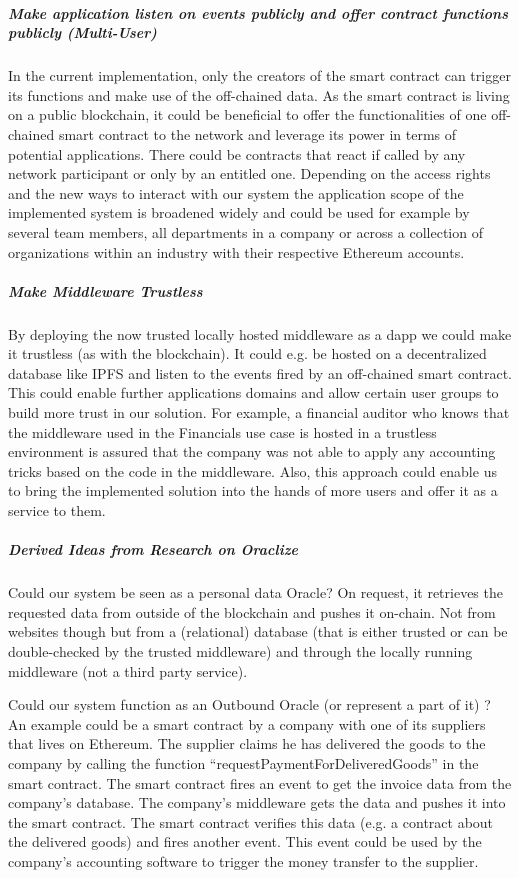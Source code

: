 \subparagraph{Make application listen on events publicly and offer contract functions publicly (Multi-User)}
In the current implementation, only the creators of the smart contract can trigger its functions and make use of the off-chained data. As the smart contract is living on a public blockchain, it could be beneficial to offer the functionalities of one off-chained smart contract to the network and leverage its power in terms of potential applications. There could be contracts that react if called by any network participant or only by an entitled one. Depending on the access rights and the new ways to interact with our system the application scope of the implemented system is broadened widely and could be used for example by several team members, all departments in a company or across a collection of organizations within an industry with their respective Ethereum accounts.

\subparagraph{Make Middleware Trustless}
By deploying the now trusted locally hosted middleware as a dapp we could make it trustless (as with the blockchain). It could e.g. be hosted on a decentralized database like IPFS and listen to the events fired by an off-chained smart contract. This could enable further applications domains and allow certain user groups to build more trust in our solution. For example, a financial auditor who knows that the middleware used in the Financials use case is hosted in a trustless environment is assured that the company was not able to apply any accounting tricks based on the code in the middleware. Also, this approach could enable us to bring the implemented solution into the hands of more users and offer it as a service to them.

\subparagraph{Derived Ideas from Research on Oraclize}
Could our system be seen as a personal data Oracle? On request, it retrieves the requested data from outside of the blockchain and pushes it on-chain. Not from websites though but from a (relational) database (that is either trusted or can be double-checked by the trusted middleware) and through the locally running middleware (not a third party service).

Could our system function as an Outbound Oracle (or represent a part of it) \cite{relatedWork01}?
An example could be a smart contract by a company with one of its suppliers that lives on Ethereum. The supplier claims he has delivered the goods to the company by calling the function “requestPaymentForDeliveredGoods” in the smart contract. The smart contract fires an event to get the invoice data from the company’s database. The company’s middleware gets the data and pushes it into the smart contract. The smart contract verifies this data (e.g. a contract about the delivered goods) and fires another event. This event could be used by the company’s accounting software to trigger the money transfer to the supplier.

